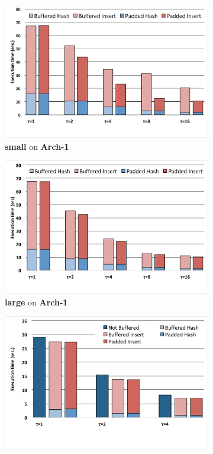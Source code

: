 \documentclass[10pt, review=true,sigconf]{acmart}
\begin{document}
\begin{figure}[htbp]
\begin{subfigure}[t]{0.43\textwidth}
\includegraphics[width=\linewidth]{expfigs/small-gandalf.pdf}
\caption{{\bf small} on {\bf Arch-1}}
\label{fig:8x211arch1}
\end{subfigure}
\begin{subfigure}[t]{0.43\textwidth}
\includegraphics[width=\linewidth]{expfigs/large-gandalf.pdf}
\caption{{\bf large} on {\bf Arch-1}}
\label{fig:8x2003arch1}
\end{subfigure}
\begin{subfigure}[t]{0.43\textwidth}
\includegraphics[width=\linewidth]{expfigs/small-rpi.pdf}

\end{subfigure}
\end{figure}
\end{document}

